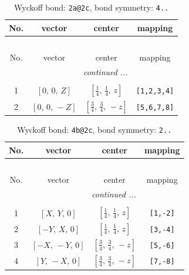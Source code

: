 \documentclass[fleqn,8pt]{jsarticle}
\begin{document}
\begin{longtable}{cccc}
\caption{Wyckoff bond: {\tt 2a@2c}, bond symmetry: {\tt 4..}}
 \\
 \hline \hline
No. & vector & center & mapping \\ \hline \endfirsthead

\multicolumn{3}{l}{\tablename\ \thetable{}} \\
 \hline \hline
No. & vector & center & mapping \\ \hline \endhead

 \hline \hline
\multicolumn{3}{r}{\footnotesize\it continued ...} \\ \endfoot

 \hline \hline
\multicolumn{3}{r}{} \\ \endlastfoot

1 & $\left[ 0,\, 0,\, Z \right]$ & $\left[ \frac{1}{4},\, \frac{1}{4},\, z \right]$ & {\tt [1,2,3,4]} \\ \hline
2 & $\left[ 0,\, 0,\, - Z \right]$ & $\left[ \frac{3}{4},\, \frac{3}{4},\, - z \right]$ & {\tt [5,6,7,8]} \\
\end{longtable}
\renewcommand{\arraystretch}{1.2}
\begin{longtable}{cccc}
\caption{Wyckoff bond: {\tt 4b@2c}, bond symmetry: {\tt 2..}}
 \\
 \hline \hline
No. & vector & center & mapping \\ \hline \endfirsthead

\multicolumn{3}{l}{\tablename\ \thetable{}} \\
 \hline \hline
No. & vector & center & mapping \\ \hline \endhead

 \hline \hline
\multicolumn{3}{r}{\footnotesize\it continued ...} \\ \endfoot

 \hline \hline
\multicolumn{3}{r}{} \\ \endlastfoot

1 & $\left[ X,\, Y,\, 0 \right]$ & $\left[ \frac{1}{4},\, \frac{1}{4},\, z \right]$ & {\tt [1,-2]} \\ \hline
2 & $\left[ - Y,\, X,\, 0 \right]$ & $\left[ \frac{1}{4},\, \frac{1}{4},\, z \right]$ & {\tt [3,-4]} \\ \hline
3 & $\left[ - X,\, - Y,\, 0 \right]$ & $\left[ \frac{3}{4},\, \frac{3}{4},\, - z \right]$ & {\tt [5,-6]} \\ \hline
4 & $\left[ Y,\, - X,\, 0 \right]$ & $\left[ \frac{3}{4},\, \frac{3}{4},\, - z \right]$ & {\tt [7,-8]} \\
\end{longtable}
\end{document}
